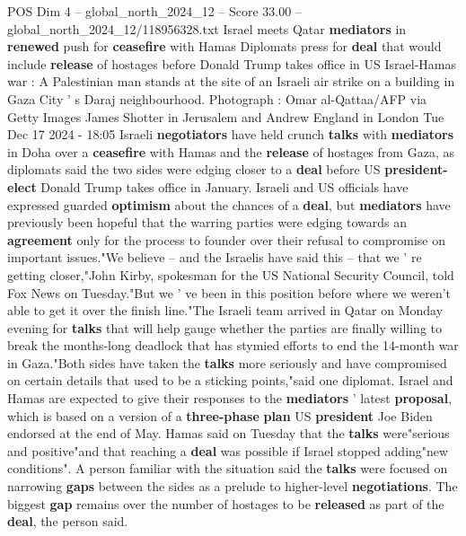 \begin{textsample}{POS Dim 4 – global\_north\_2024\_12 – Score 33.00 – global\_north\_2024\_12/118956328.txt}  \label{ex:f4_pos_321}
Israel meets Qatar \textbf{mediators} in \textbf{renewed} push for \textbf{ceasefire} with Hamas Diplomats press for \textbf{deal} that would include \textbf{release} of hostages before Donald Trump takes office in US Israel-Hamas war : A Palestinian man stands at the site of an Israeli air strike on a building in Gaza City ' s Daraj neighbourhood.
Photograph : Omar al-Qattaa/AFP via Getty Images James Shotter in Jerusalem and Andrew England in London Tue Dec 17 2024 - 18:05 Israeli \textbf{negotiators} have held crunch \textbf{talks} with \textbf{mediators} in Doha over a \textbf{ceasefire} with Hamas and the \textbf{release} of hostages from Gaza, as diplomats said the two sides were edging closer to a \textbf{deal} before US \textbf{president-elect} Donald Trump takes office in January.
Israeli and US officials have expressed guarded \textbf{optimism} about the chances of a \textbf{deal}, but \textbf{mediators} have previously been hopeful that the warring parties were edging towards an \textbf{agreement} only for the process to founder over their refusal to compromise on important issues."We believe -- and the Israelis have said this -- that we ' re getting closer,"John Kirby, spokesman for the US National Security Council, told Fox News on Tuesday."But we ' ve been in this position before where we weren't able to get it over the finish line."The Israeli team arrived in Qatar on Monday evening for \textbf{talks} that will help gauge whether the parties are finally willing to break the months-long deadlock that has stymied efforts to end the 14-month war in Gaza."Both sides have taken the \textbf{talks} more seriously and have compromised on certain details that used to be a sticking points,"said one diplomat.
Israel and Hamas are expected to give their responses to the \textbf{mediators} ' latest \textbf{proposal}, which is based on a version of a \textbf{three-phase} \textbf{plan} US \textbf{president} Joe Biden endorsed at the end of May.
Hamas said on Tuesday that the \textbf{talks} were"serious and positive"and that reaching a \textbf{deal} was possible if Israel stopped adding"new conditions".
A person familiar with the situation said the \textbf{talks} were focused on narrowing \textbf{gaps} between the sides as a prelude to higher-level \textbf{negotiations}.
The biggest \textbf{gap} remains over the number of hostages to be \textbf{released} as part of the \textbf{deal}, the person said.

\end{textsample}
